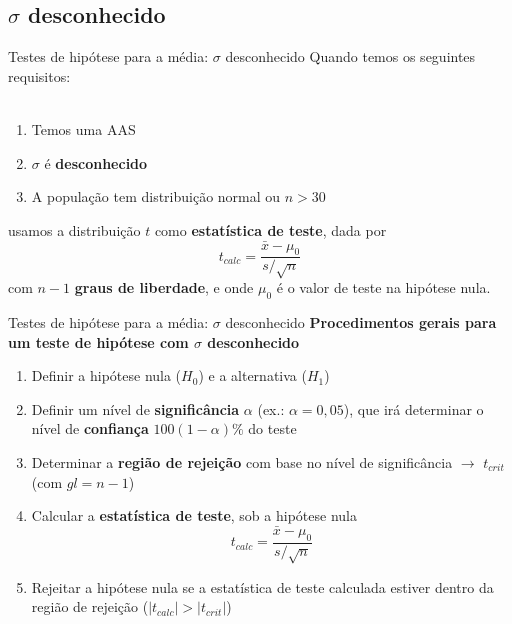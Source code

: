 \documentclass[10pt]{beamer}\usepackage[]{graphicx}\usepackage[]{color}
\theoremstyle{definition}
\begin{document}
\subsection[$\sigma$ desconhe.]{$\sigma$ desconhecido}

\begin{frame}{Testes de hipótese para a média: $\sigma$ desconhecido}
  Quando temos os seguintes requisitos: \\~\\
  \begin{enumerate}
  \item Temos uma AAS
  \item $\sigma$ é \textbf{desconhecido}
  \item A população tem distribuição normal ou $n>30$
  \end{enumerate}
  \vspace{1em}
  usamos a distribuição $t$ como \textbf{estatística de teste}, dada por
  \begin{equation*}
    t_{calc} = \frac{\bar{x} - \mu_0}{s/\sqrt{n}}
  \end{equation*}
  com $n-1$ \textbf{graus de liberdade}, e onde $\mu_0$ é o valor de
  teste na hipótese nula.
\end{frame}

\begin{frame}{Testes de hipótese para a média: $\sigma$ desconhecido}
  \textbf{Procedimentos gerais para um teste de hipótese com $\sigma$
    desconhecido}
\begin{enumerate}
\item Definir a hipótese nula ($H_0$) e a alternativa ($H_1$)
\item Definir um nível de \textbf{significância} $\alpha$ (ex.: $\alpha
  = 0,05$), que irá determinar o nível de \textbf{confiança}
  $100(1-\alpha)\%$ do teste
\item Determinar a \textbf{região de rejeição} com base no nível de
  significância $\rightarrow$ $t_{crit}$ (com $gl = n-1$)
\item Calcular a \textbf{estatística de teste}, sob a hipótese nula
  \begin{equation*}
    t_{calc} = \frac{\bar{x} - \mu_0}{s/\sqrt{n}}
  \end{equation*}
\item Rejeitar a hipótese nula se a estatística de teste calculada
  estiver dentro da região de rejeição ($|t_{calc}| > |t_{crit}|$)
\end{enumerate}
\end{frame}
\end{document}
